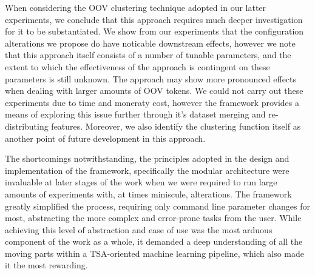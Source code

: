 \documentclass[../../fyp.tex]{subfiles}
\begin{document}
When considering the OOV clustering technique adopted in our latter experiments, we conclude that this approach requires much deeper investigation for it to be substantiated. We show from our experiments that the configuration alterations we propose do have noticable downstream effects, however we note that this approach itself consists of a number of tunable parameters, and the extent to which the effectiveness of the approach is contingent on these parameters is still unknown. The approach may show more pronounced effects when dealing with larger amounts of OOV tokens. We could not carry out these experiments due to time and moneraty cost, however the framework provides a means of exploring this issue further through it's dataset merging and re-distributing features. Moreover, we also identify the clustering function itself as another point of future development in this approach. 

The shortcomings notwithstanding, the principles adopted in the design and implementation of the framework, specifically the modular architecture were invaluable at later stages of the work when we were required to run large amounts of experiments with, at times miniscule, alterations. The framework greatly simplified the process, requiring only command line parameter changes for most, abstracting the more complex and error-prone tasks from the user. While achieving this level of abstraction and ease of use was the most arduous component of the work as a whole, it demanded a deep understanding of all the moving parts within a TSA-oriented machine learning pipeline, which also made it the most rewarding.
\end{document}
